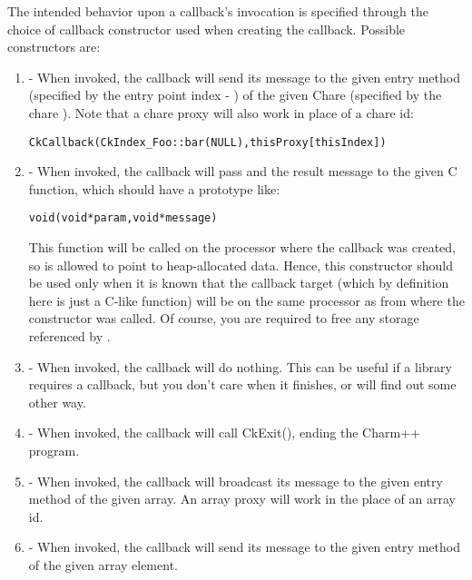 The intended behavior upon a callback's invocation is specified
through the choice of callback constructor used when creating the callback. 
Possible constructors are: 

\begin{enumerate}
\item {} - When invoked, the
callback will send its message to the given entry method (specified by the
entry point index - ) of the given
Chare (specified by the chare ).  Note that a chare proxy will also work in place of a chare id:

\begin{alltt}
  CkCallback(CkIndex_Foo::bar(NULL), thisProxy[thisIndex])
\end{alltt}

\item {} - 
When invoked, the callback will pass  and the result message
to the given C function, which should have a prototype
like:

\begin{alltt}
void (void *param, void *message)
\end{alltt}

This function will be called on the processor where the callback was created,
so  is allowed to point to heap-allocated data.  Hence, this 
constructor should be used only when it is known that the callback target (which by definition here
is just a C-like function) will be on the same processor as from where the constructor was called. 
Of course, you
are required to free any storage referenced by .

\item {} - When invoked, the callback
will do nothing.  This can be useful if a \charmpp{} library requires
a callback, but you don't care when it finishes, or will find out some
other way.

\item {} - When invoked, the callback
will call CkExit(), ending the Charm++ program.

\item {} - 
When invoked,
the callback will broadcast its message to the given entry method
of the given array.  An array proxy will work in the place of an array id.

\item {} - 
When invoked,
the callback will send its message to the given entry method
of the given array element. 


\end{enumerate}

